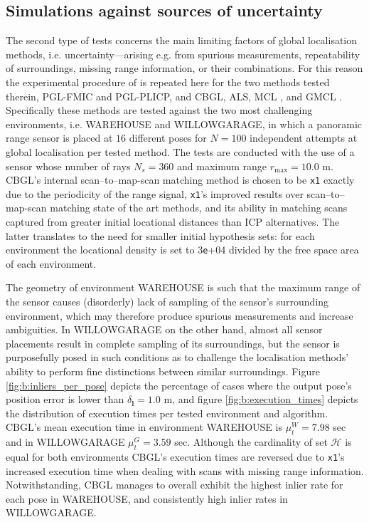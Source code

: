 \subsection{Simulations against sources of uncertainty}

The second type of tests concerns the main limiting factors of global
localisation methods, i.e. uncertainty---arising e.g. from spurious
measurements, repeatability of surroundings, missing range information, or
their combinations. For this reason the experimental procedure of
\cite{Filotheou2022g} is repeated here for the two methods tested therein,
PGL-FMIC and PGL-PLICP, and CBGL, ALS, MCL \cite{mcl}, and GMCL \cite{gmcl}.
Specifically these methods are tested against the two most challenging
environments, i.e. WAREHOUSE and WILLOWGARAGE, in which a panoramic range
sensor is placed at $16$ different poses for $N = 100$ independent attempts at
global localisation per tested method. The tests are conducted with the use of
a sensor whose number of rays $N_s = 360$ and maximum range $r_{\max} = 10.0$
m.  CBGL's internal scan--to--map-scan matching method is chosen to be
\texttt{x1} \cite{Filotheou2023a} exactly due to the periodicity of the range
signal, \texttt{x1}'s improved results over scan--to--map-scan matching state
of the art methods, and its ability in matching scans captured from greater
initial locational distances than ICP alternatives. The latter translates to
the need for smaller initial hypothesis sets: for each environment the
locational density is set to $3$\texttt{e}+04 divided by the free space area of
each environment.

The geometry of environment WAREHOUSE is such that the maximum range of the
sensor causes (disorderly) lack of sampling of the sensor's surrounding
environment, which may therefore produce spurious measurements and increase
ambiguities. In WILLOWGARAGE on the other hand, almost all sensor placements
result in complete sampling of its surroundings, but the sensor is purposefully
posed in such conditions as to challenge the localisation methods' ability to
perform fine distinctions between similar surroundings. Figure
\ref{fig:b:inliers_per_pose} depicts the percentage of cases where the output
pose's position error is lower than $\delta_{\bm{l}} = 1.0$ m, and figure
\ref{fig:b:execution_times} depicts the distribution of execution times per
tested environment and algorithm. CBGL's mean execution time in environment
WAREHOUSE is $\mu_t^W = 7.98$ sec and in WILLOWGARAGE $\mu_t^{G} = 3.59$ sec.
Although the cardinality of set $\mathcal{H}$ is equal for both environments
CBGL's execution times are reversed due to \texttt{x1}'s increased execution
time when dealing with scans with missing range information. Notwithstanding,
CBGL manages to overall exhibit the highest inlier rate for each pose in
WAREHOUSE, and consistently high inlier rates in WILLOWGARAGE.


